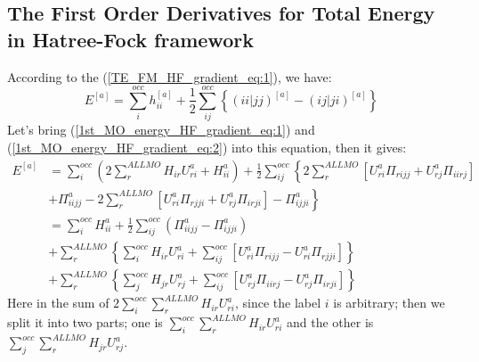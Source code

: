 \subsection{The First Order Derivatives for Total Energy in Hatree-Fock
framework}
%
%
%
According to the (\ref{TE_FM_HF_gradient_eq:1}), we have:
\begin{equation}
 \label{FOD_energy_HF_derivatives_eq:1}
E^{[a]} = \sum_{i}^{occ}h_{ii}^{[a]} + \frac{1}{2}
    \sum_{ij}^{occ}
    \left \{ ( ii|jj)^{[a]} - ( ij|ji)^{[a]}
    \right \} 
\end{equation}
Let's bring (\ref{1st_MO_energy_HF_gradient_eq:1}) and
(\ref{1st_MO_energy_HF_gradient_eq:2}) into this equation, then it gives:
\begin{equation}
\label{FOD_energy_HF_derivatives_eq:2}
 \begin{split}
  E^{[a]} &= \sum_{i}^{occ}\left( 2\sum_{r}^{ALL MO}H_{ir}U^{a}_{ri} +
H^{a}_{ii} \right) + \frac{1}{2}\sum_{ij}^{occ}\left\lbrace 2\sum_{r}^{ALL
MO}\left[
U^{a}_{ri}\Pi_{rijj} +
U^{a}_{rj}\Pi_{iirj}\right]  \right. \\ 
&\left. + \Pi^{a}_{iijj} - 2\sum_{r}^{ALL MO}\left[
U^{a}_{ri}\Pi_{rjji} + U^{a}_{rj}\Pi_{irji}\right]  -
\Pi^{a}_{ijji}\right\rbrace \\
&= \sum_{i}^{occ}H^{a}_{ii} + \frac{1}{2}\sum_{ij}^{occ}\left( \Pi^{a}_{iijj} -
\Pi^{a}_{ijji}\right) \\
&+ \sum_{r}^{ALL MO}\left\lbrace  \sum_{i}^{occ}H_{ir}U^{a}_{ri} +
\sum_{ij}^{occ}\left[ U^{a}_{ri}\Pi_{rijj} - U^{a}_{ri}\Pi_{rjji}\right] 
\right\rbrace \\
&+ \sum_{r}^{ALL MO}\left\lbrace  \sum_{j}^{occ}H_{jr}U^{a}_{rj} +
\sum_{ij}^{occ}\left[ U^{a}_{rj}\Pi_{iirj} - U^{a}_{rj}\Pi_{irji}\right] 
\right\rbrace
 \end{split}
\end{equation}
Here in the sum of $2\sum_{i}^{occ}\sum_{r}^{ALL MO}H_{ir}U^{a}_{ri}$, since
the label $i$ is arbitrary; then we split it into two parts; one is
$\sum_{i}^{occ}\sum_{r}^{ALL MO}H_{ir}U^{a}_{ri}$ and the other is
$\sum_{j}^{occ}\sum_{r}^{ALL MO}H_{jr}U^{a}_{rj}$.


